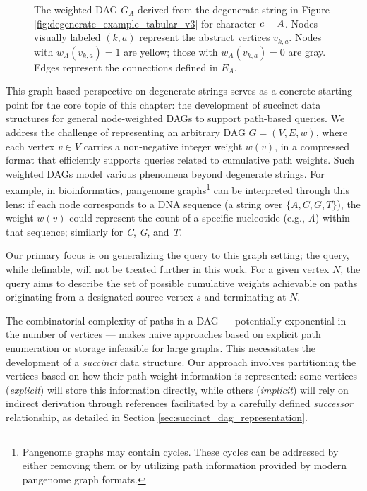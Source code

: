 \begin{figure}[htbp]
    \caption{The weighted DAG $G_A$ derived from the degenerate string in Figure \ref{fig:degenerate_example_tabular_v3} for character $c=\emph{A}$. Nodes visually labeled $(k,a)$ represent the abstract vertices $v_{k,a}$. Nodes with $w_A(v_{k,a})=1$ are yellow; those with $w_A(v_{k,a})=0$ are gray. Edges represent the connections defined in $E_A$.}
    \label{fig:degenerate_dag_horizontal_v3}
\end{figure}

This graph-based perspective on degenerate strings serves as a concrete starting point for the core topic of this chapter: the development of succinct data structures for general node-weighted DAGs to support path-based queries. We address the challenge of representing an arbitrary DAG $G=(V, E, w)$, where each vertex $v \in V$ carries a non-negative integer weight $w(v)$, in a compressed format that efficiently supports queries related to cumulative path weights. Such weighted DAGs model various phenomena beyond degenerate strings. For example, in bioinformatics, pangenome graphs\footnote{Pangenome graphs may contain cycles. These cycles can be addressed by either removing them or by utilizing path information provided by modern pangenome graph formats.} can be interpreted through this lens: if each node corresponds to a DNA sequence (a string over $\{A, C, G, T\}$), the weight $w(v)$ could represent the count of a specific nucleotide (e.g., \emph{A}) within that sequence; similarly for \emph{C}, \emph{G}, and \emph{T}.

Our primary focus is on generalizing the \Rank{} query to this graph setting; the \Select{} query, while definable, will not be treated further in this work. For a given vertex $N$, the \Rank{} query aims to describe the set of possible cumulative weights achievable on paths originating from a designated source vertex $s$ and terminating at $N$.

The combinatorial complexity of paths in a DAG — potentially exponential in the number of vertices — makes naive approaches based on explicit path enumeration or storage infeasible for large graphs. This necessitates the development of a \emph{succinct} data structure. Our approach involves partitioning the vertices based on how their path weight information is represented: some vertices (\emph{explicit}) will store this information directly, while others (\emph{implicit}) will rely on indirect derivation through references facilitated by a carefully defined \emph{successor} relationship, as detailed in Section \ref{sec:succinct_dag_representation}.

